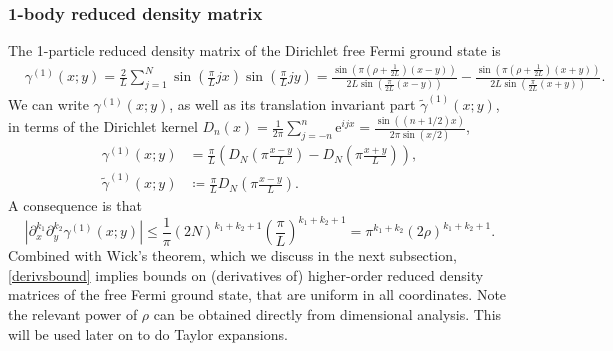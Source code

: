 \documentclass[a4paper,11pt]{article}
\newcommand{\euler}[1]{\text{e}^{#1}}
\newcommand{\abs}[1]{\left\lvert #1 \right\rvert}
\numberwithin{equation}{section}
\begin{document}
	\subsubsection{1-body reduced density matrix}
	The 1-particle reduced density matrix of the Dirichlet free Fermi ground state is
	\begin{equation}
		\begin{aligned}
			&\gamma^{(1)}(x;y)=\frac{2}{L}\sum_{j=1}^{N}\sin\left(\frac{\pi}{L}jx\right)\sin\left(\frac{\pi}{L} jy\right)=\frac{\sin\left(\pi\left(\rho+\frac{1}{2L}\right)(x-y)\right)}{2L\sin\left(\frac{\pi}{2L}(x-y)\right)}-\frac{\sin\left(\pi\left(\rho+\frac{1}{2L}\right)(x+y)\right)}{2L\sin\left(\frac{\pi}{2L}(x+y)\right)}.
		\end{aligned}
	\end{equation}
	We can write $ \gamma^{(1)}(x;y)$, as well as its translation invariant part $\tilde{\gamma}^{(1)}(x;y) $, in terms of the Dirichlet kernel $ D_n(x)=\frac{1}{2\pi}\sum_{j=-n}^{n}\euler{ijx}=\frac{\sin((n+1/2)x)}{2\pi\sin(x/2)} $, \begin{equation}
		\begin{aligned}
			\label{gamma1tildegamma1}
			\gamma^{(1)}(x;y)&=\frac{\pi}{L}\left(D_{N}\left(\pi\frac{x-y}{L}\right)-D_{N}\left(\pi\frac{x+y}{L}\right)\right),\\
			\tilde{\gamma}^{(1)}(x;y)&\coloneqq \frac{\pi}{L}D_{N}\left(\pi \frac{x-y}{L}\right).
		\end{aligned}
	\end{equation}
	A consequence is that 
	\begin{equation}
		\label{derivsbound}
		\abs{\partial_{x}^{k_1}\partial_{y}^{k_2}\gamma^{(1)}(x;y)}\leq \frac{1}{\pi}(2N)^{k_1+k_2+1}\left(\frac{\pi}{L}\right)^{k_1+k_2+1}=\pi^{k_1+k_2}(2\rho)^{k_1+k_2+1}.
	\end{equation}
	Combined with Wick's theorem, which we discuss in the next subsection, \eqref{derivsbound} implies bounds on (derivatives of) higher-order reduced density matrices of the free Fermi ground state, that are uniform in all coordinates. Note the relevant power of $ \rho $ can be obtained directly from dimensional analysis. This will be used later on to do Taylor expansions.\\
\end{document}
